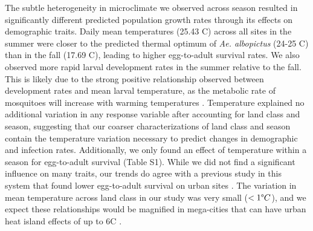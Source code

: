 \documentclass[doublespacing, linenumbers]{bmcart}
\begin{document}
The subtle heterogeneity in microclimate we observed across season resulted in significantly different predicted population growth rates through its effects on demographic traits.
Daily mean temperatures (25.43 \degree C) across all sites in the summer were closer to the predicted thermal optimum of \textit{Ae. albopictus} (24-25 \degree C) \cite{mordecai2017} than in the fall (17.69 \degree C), leading to higher egg-to-adult survival rates.
We also observed more rapid larval development rates in the summer relative to the fall.
This is likely due to the strong positive relationship observed between development rates and mean larval temperature, as the metabolic rate of mosquitoes will increase with warming temperatures \cite{delatte2009}.
Temperature explained no additional variation in any response variable after accounting for land class and season, suggesting that our coarser characterizations of land class and season contain the temperature variation necessary to predict changes in demographic and infection rates.
Additionally, we only found an effect of temperature within a season for egg-to-adult survival (Table S1).
While we did not find a significant influence on many traits, our trends do agree with a previous study in this system that found lower egg-to-adult survival on urban sites \cite{murdock2017}.
The variation in mean temperature across land class in our study was very small ($<1\degree C$), and we expect these relationships would be magnified in mega-cities that can have urban heat island effects of up to 6\degree C \cite{peng2012}.
\end{document}
